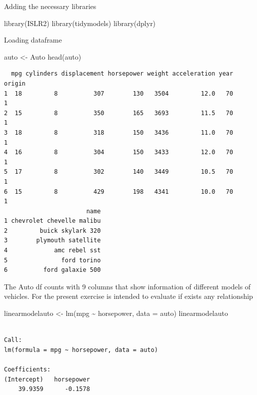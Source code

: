 \documentclass[
  letterpaper,
  DIV=11,
  numbers=noendperiod]{scrartcl}
\newenvironment{Shaded}{\begin{snugshade}}{\end{snugshade}}
\newcommand{\AttributeTok}[1]{\textcolor[rgb]{0.40,0.45,0.13}{#1}}
\newcommand{\FunctionTok}[1]{\textcolor[rgb]{0.28,0.35,0.67}{#1}}
\newcommand{\NormalTok}[1]{\textcolor[rgb]{0.00,0.23,0.31}{#1}}
\newcommand{\OtherTok}[1]{\textcolor[rgb]{0.00,0.23,0.31}{#1}}
\newcommand{\SpecialCharTok}[1]{\textcolor[rgb]{0.37,0.37,0.37}{#1}}
\begin{document}
Adding the necessary libraries

\begin{Shaded}
\begin{Highlighting}[]
\FunctionTok{library}\NormalTok{(ISLR2)}
\FunctionTok{library}\NormalTok{(tidymodels)}
\FunctionTok{library}\NormalTok{(dplyr)}
\end{Highlighting}
\end{Shaded}

Loading dataframe

\begin{Shaded}
\begin{Highlighting}[]
\NormalTok{auto }\OtherTok{\textless{}{-}}\NormalTok{ Auto}
\FunctionTok{head}\NormalTok{(auto)}
\end{Highlighting}
\end{Shaded}

\begin{verbatim}
  mpg cylinders displacement horsepower weight acceleration year origin
1  18         8          307        130   3504         12.0   70      1
2  15         8          350        165   3693         11.5   70      1
3  18         8          318        150   3436         11.0   70      1
4  16         8          304        150   3433         12.0   70      1
5  17         8          302        140   3449         10.5   70      1
6  15         8          429        198   4341         10.0   70      1
                       name
1 chevrolet chevelle malibu
2         buick skylark 320
3        plymouth satellite
4             amc rebel sst
5               ford torino
6          ford galaxie 500
\end{verbatim}

The Auto df counts with 9 columns that show information of different
models of vehicles. For the present exercise is intended to evaluate if
exists any relationship

\begin{Shaded}
\begin{Highlighting}[]
\NormalTok{linearmodelauto }\OtherTok{\textless{}{-}} \FunctionTok{lm}\NormalTok{(mpg }\SpecialCharTok{\textasciitilde{}}\NormalTok{ horsepower, }\AttributeTok{data =}\NormalTok{ auto)}
\NormalTok{linearmodelauto}
\end{Highlighting}
\end{Shaded}

\begin{verbatim}

Call:
lm(formula = mpg ~ horsepower, data = auto)

Coefficients:
(Intercept)   horsepower  
    39.9359      -0.1578  
\end{verbatim}
\end{document}
